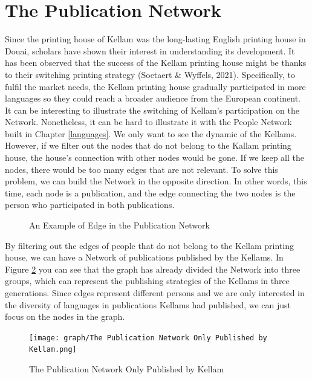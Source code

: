 \documentclass[12pt,a4paper,oneside]{book}
\begin{document}
\begin{sloppypar}
\section{The Publication Network}
Since the printing house of Kellam was the long-lasting English printing house in Douai, scholars have shown their interest in understanding its development. It has been observed that the success of the Kellam printing house might be thanks to their switching printing strategy (Soetaert \& Wyffels, 2021). Specifically, to fulfil the market needs, the Kellam printing house gradually participated in more languages so they could reach a broader audience from the European continent. It can be interesting to illustrate the switching of Kellam’s participation on the Network. Nonetheless, it can be hard to illustrate it with the People Network built in Chapter \ref{languages}. We only want to see the dynamic of the Kellams. However, if we filter out the nodes that do not belong to the Kallam printing house, the house’s connection with other nodes would be gone. If we keep all the nodes, there would be too many edges that are not relevant. To solve this problem, we can build the Network in the opposite direction. In other words, this time, each node is a publication, and the edge connecting the two nodes is the person who participated in both publications.

\begin{figure}[H]
\centering

\caption{An Example of Edge in the Publication Network}
\label{fig:examplePubNet}
\end{figure}

\pagebreak
By filtering out the edges of people that do not belong to the Kellam printing house, we can have a Network of publications published by the Kellams. In Figure \ref{fig:pubNet} you can see that the graph has already divided the Network into three groups, which can represent the publishing strategies of the Kellams in three generations. Since edges represent different persons and we are only interested in the diversity of languages in publications Kellams had published, we can just focus on the nodes in the graph.

\begin{figure}[H]
\centering
\texttt{[image: graph/The Publication Network Only Published by Kellam.png]}
\caption{The Publication Network Only Published by Kellam}
\label{fig:pubNet}
\end{figure}


\end{sloppypar}
\end{document}
